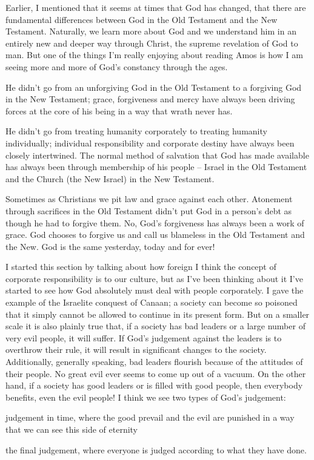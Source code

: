 Earlier, I mentioned that it seems at times that God has changed, that there are
fundamental differences between God in the Old Testament and the New Testament.
Naturally, we learn more about God and we understand him in an entirely new and
deeper way through Christ, the supreme revelation of God to man. But one of the
things I'm really enjoying about reading Amos is how I am seeing more and more
of God's constancy through the ages.

He didn't go from an unforgiving God in the Old Testament to a forgiving God in
the New Testament; grace, forgiveness and mercy have always been driving forces
at the core of his being in a way that wrath never has.

He didn't go from treating humanity corporately to treating humanity
individually; individual responsibility and corporate destiny have always been
closely intertwined. The normal method of salvation that God has made available
has always been through membership of his people -- Israel in the Old Testament
and the Church (the New Israel) in the New Testament.

Sometimes as Christians we pit law and grace against each other. Atonement
through sacrifices in the Old Testament didn't put God in a person's debt as
though he had to forgive them. No, God's forgiveness has always been a work of
grace. God chooses to forgive us and call us blameless in the Old Testament and
the New. God is the same yesterday, today and for ever!

I started this section by talking about how foreign I think the concept of
corporate responsibility is to our culture, but as I've been thinking about it
I've started to see how God absolutely must deal with people corporately. I gave
the example of the Israelite conquest of Canaan; a society can become so
poisoned that it simply cannot be allowed to continue in its present form. But
on a smaller scale it is also plainly true that, if a society has bad leaders or
a large number of very evil people, it will suffer. If God's judgement against
the leaders is to overthrow their rule, it will result in significant changes to
the society. Additionally, generally speaking, bad leaders flourish because of
the attitudes of their people. No great evil ever seems to come up out of a
vacuum. On the other hand, if a society has good leaders or is filled with good
people, then everybody benefits, even the evil people! I think we see two types
of God's judgement: \begin{inparaenum}[(1)]
                        \item judgement in time, where the good prevail and the evil are punished in a
                        way that we can see this side of eternity
                        \item the final judgement, where everyone is judged according to what they have
                        done.
\end{inparaenum}

